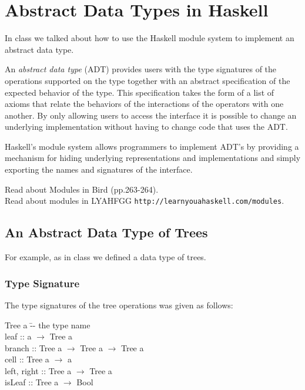 \documentclass[11pt]{article}
\begin{document}


\section{Abstract Data Types in Haskell}

In class we talked about how to use the Haskell module system to implement an abstract data type.

An {\em{abstract data type}} (ADT) provides users with the type
signatures of the operations supported on the type together with an
abstract specification of the expected behavior of the type.  This
specification takes the form of a list of axioms that relate the
behaviors of the interactions of the operators with one another.  By
only allowing users to access the interface it is possible to change
an underlying implementation without having to change code that uses
the ADT.

Haskell's module system allows programmers to implement ADT's by
providing a mechanism for hiding underlying representations and
implementations and simply exporting the names and signatures of the
interface.

\begin{exercise}
Read about Modules in Bird (pp.263-264). \\
Read about modules in LYAHFGG {\tt{http://learnyouahaskell.com/modules}}.
\end{exercise}



\subsection{An Abstract Data Type of Trees}

For example, as in class we defined a data type of trees.

\subsubsection{Type Signature}

The type signatures of the tree operations was given as follows:

\begin{program**}
\>                           Tree a             \=-- the type name  \\
\>                           leaf                    \>:: a $\rightarrow$ Tree a \\
\>                           branch                  \>:: Tree a $\rightarrow$ Tree a $\rightarrow$ Tree a \\
\>                           cell                    \>:: Tree a $\rightarrow$ a \\
\>                           left, right             \>:: Tree a $\rightarrow$ Tree a \\
\>                           isLeaf                  \>:: Tree a $\rightarrow$ Bool \\
\end{program**}
\end{document}
